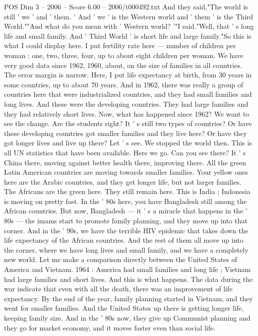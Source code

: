 \begin{textsample}{POS Dim 3 – 2006 – Score 6.00 – 2006/t000492.txt}
And they said,"The world is still ' we ' and ' them. ' And ' we ' is the Western world and ' them ' is the Third World.""And what do you mean with ' Western world? '"I said."Well, that ' s long life and small family.
And ' Third World ' is short life and large family."So this is what I could display here.
I put fertility rate here — number of children per woman : one, two, three, four, up to about eight children per woman.
We have very good data since 1962, 1960, about, on the size of families in all countries.
The error margin is narrow.
Here, I put life expectancy at birth, from 30 years in some countries, up to about 70 years.
And in 1962, there was really a group of countries here that were industrialized countries, and they had small families and long lives.
And these were the developing countries.
They had large families and they had relatively short lives.
Now, what has happened since 1962?
We want to see the change.
Are the students right?
It ' s still two types of countries?
Or have these developing countries got smaller families and they live here?
Or have they got longer lives and live up there?
Let ' s see.
We stopped the world then.
This is all UN statistics that have been available.
Here we go.
Can you see there?
It ' s China there, moving against better health there, improving there.
All the green Latin American countries are moving towards smaller families.
Your yellow ones here are the Arabic countries, and they get longer life, but not larger families.
The Africans are the green here.
They still remain here.
This is India ; Indonesia is moving on pretty fast.
In the ' 80s here, you have Bangladesh still among the African countries.
But now, Bangladesh — it ' s a miracle that happens in the ' 80s — the imams start to promote family planning, and they move up into that corner.
And in the ' 90s, we have the terrible HIV epidemic that takes down the life expectancy of the African countries.
And the rest of them all move up into the corner, where we have long lives and small family, and we have a completely new world.
Let me make a comparison directly between the United States of America and Vietnam. 1964 : America had small families and long life ; Vietnam had large families and short lives.
And this is what happens.
The data during the war indicate that even with all the death, there was an improvement of life expectancy.
By the end of the year, family planning started in Vietnam, and they went for smaller families.
And the United States up there is getting longer life, keeping family size.
And in the ' 80s now, they give up Communist planning and they go for market economy, and it moves faster even than social life.

\end{textsample}
